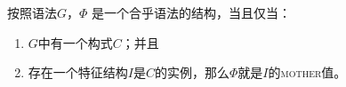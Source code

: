 \ea
\label{meta-construction-statemnet}
按照语法$G$，$\Phi$ 是一个合乎语法的结构，当且仅当：
\begin{enumerate}
\item $G$中有一个构式$C$；并且
\item 存在一个特征结构$I$是$C$的实例，那么$\Phi$就是$I$的\textsc{mother}值。
\end{enumerate}
\z

